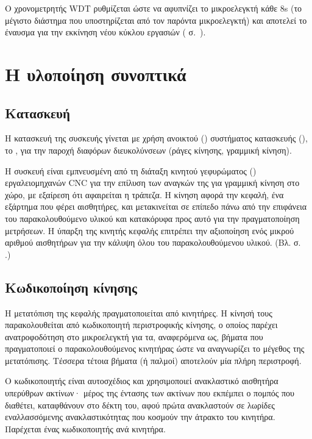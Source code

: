 Ο χρονομετρητής WDT ρυθμίζεται ώστε να αφυπνίζει το μικροελεγκτή κάθε 8s (το
μέγιστο διάστημα που υποστηρίζεται από τον παρόντα μικροελεγκτή) και αποτελεί το
έναυσμα για την εκκίνηση νέου κύκλου εργασιών
( σ.~\pageref{ssubsec:task:initiate}).


\section{Η υλοποίηση συνοπτικά}


\subsection{Κατασκευή}

Η κατασκευή της συσκευής γίνεται με χρήση ανοικτού ()
συστήματος κατασκευής (), το , για
την παροχή διαφόρων διευκολύνσεων (ράγες κίνησης, γραμμική κίνηση).

Η συσκευή είναι εμπνευσμένη από τη διάταξη κινητού γεφυρώματος () εργαλειομηχανών CNC για την επίλυση των αναγκών της για γραμμική κίνηση
στο χώρο, με εξαίρεση ότι αφαιρείται η τράπεζα.
Η κίνηση αφορά την κεφαλή, ένα εξάρτημα που φέρει αισθητήρες, και μετακινείται
σε επίπεδο πάνω από την επιφάνεια του παρακολουθούμενο υλικού και κατακόρυφα
προς αυτό για την πραγματοποίηση μετρήσεων. Η ύπαρξη της κινητής κεφαλής
επιτρέπει την αξιοποίηση ενός μικρού αριθμού αισθητήρων για την κάλυψη όλου του
παρακολουθούμενου υλικού. (Bλ.  σ.~%
\pageref{ch:construction}.)


\subsection{Κωδικοποίηση κίνησης}

Η μετατόπιση της κεφαλής πραγματοποιείται από κινητήρες. Η κίνησή τους
παρακολουθείται από κωδικοποιητή περιστροφικής κίνησης, ο οποίος παρέχει
ανατροφοδότηση στο μικροελεγκτή για τα, αναφερόμενα ως, βήματα που πραγματοποιεί
ο παρακολουθούμενος κινητήρας ώστε να αναγνωρίζει το μέγεθος της μετατόπισης.
Τέσσερα τέτοια βήματα (ή παλμοί) αποτελούν μία πλήρη περιστροφή.

Ο κωδικοποιητής είναι αυτοσχέδιος και χρησιμοποιεί ανακλαστικό αισθητήρα
υπερύθρων ακτίνων· μέρος της έντασης των ακτίνων που εκπέμπει ο πομπός που
διαθέτει, καταφθάνουν στο δέκτη του, αφού πρώτα ανακλαστούν σε λωρίδες
εναλλασσόμενης ανακλαστικότητας που κοσμούν την άτρακτο του κινητήρα. Παρέχεται
ένας κωδικοποιητής ανά κινητήρα.

